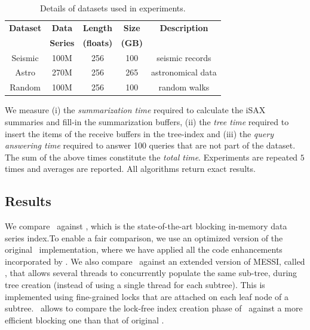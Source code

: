 \begin{table}[htbp]
    \centering
    \renewcommand{\arraystretch}{1.2} %
    \begin{tabular}{||c | c | c | c | c||} 
        \hline
        \textbf{Dataset} & \textbf{Data} & \textbf{Length} & \textbf{Size} & \textbf{Description}  \\ 
        & \textbf{Series} & \textbf{(floats)} & \textbf{(GB)} & \\ [0.5ex]
        \hline\hline
        Seismic & 100M & 256 & 100 & seismic records  \\ 
        \hline
        Astro & 270M & 256 & 265 & astronomical data \\ 
        \hline
        Random & 100M & 256 & 100 & random walks  \\ 
        \hline
    \end{tabular}
    \caption{Details of datasets used in experiments.}
    \label{table:datasets}
\end{table}
\clearpage
{}
% 
We measure (i) the {\em summarization time} required to calculate
the iSAX summaries and fill-in the summarization buffers, 
(ii) the {\em tree time} required to insert the items of the receive buffers in the
tree-index and (iii) the {\em query answering time} required to answer 100 queries
that are not part of the dataset. 
The  sum of the above times constitute the {\em total time}.
Experiments are repeated $5$ times and averages are reported.
All algorithms return exact results.

\subsection{Results}

We compare \Fresh\ against \MESSI, which is the state-of-the-art blocking
in-memory data series index.To enable a fair comparison, we use an 
optimized version of the original \MESSI\ implementation,
where we have applied all the code enhancements incorporated by \Fresh.
% 
We also compare \Fresh\ against an extended version of MESSI, called \MESSIenh
, that allows several threads to concurrently populate the same sub-tree, during tree creation
(instead of using a single thread for each subtree).
This is implemented using fine-grained locks that are attached on each leaf node of a subtree.
\MESSIenh\ allows to compare the lock-free index creation phase of \Fresh\ against a more
efficient blocking one than that of original \MESSI.

